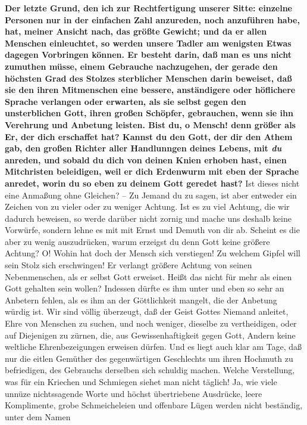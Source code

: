 \label{ref:10_08_duzen} \textbf{Der letzte Grund, den ich zur Rechtfertigung
unserer Sitte: einzelne Personen
nur in der einfachen Zahl anzureden, noch anzuführen habe, hat, meiner Ansicht
nach, das größte Gewicht; und da er allen Menschen einleuchtet, so werden unsere
Tadler am wenigsten Etwas dagegen Vorbringen können. Er besteht darin, daß man
es uns nicht zumuthen müsse, einem Gebrauche nachzugehen, der gerade den
höchsten Grad des Stolzes sterblicher Menschen darin beweiset, daß sie den ihren
Mitmenschen eine bessere, anständigere oder höflichere Sprache verlangen oder
erwarten, als sie selbst gegen den unsterblichen Gott, ihren großen Schöpfer,
gebrauchen, wenn sie ihn Verehrung und Anbetung leisten.  Bist du, o Mensch! denn
größer als Er, der dich erschaffet hat? Kannst du den Gott, der dir den Athem
gab, den großen Richter aller Handlunngen deines Lebens, mit \textit{du}
anreden, und
sobald du dich von deinen Knien erhoben hast, einen Mitchristen beleidigen, weil
er dich Erdenwurm mit eben der Sprache anredet, worin du so
eben zu deinem Gott
geredet hast?} Ist dieses nicht eine Anmaßung ohne Gleichen? -- Zu Jemand du zu
sagen, ist aber entweder ein Zeichen von zu vieler oder zu weniger Achtung. Ist
es zu viel Achtung, die wir dadurch beweisen, so werde darüber nicht zornig und
mache uns deshalb keine Vorwürfe, sondern lehne es mit mit Ernst und Demuth von
dir ab. Scheint es die aber zu wenig auszudrücken, warum erzeigst du denn Gott
keine größere Achtung? O! Wohin hat doch der Mensch sich verstiegen! Zu welchem
Gipfel will sein Stolz sich erschwingen! Er verlangt größere Achtung von seinen
Nebenmenschen, als er selbst Gott erweiset. Heißt das nicht für mehr als einen
Gott gehalten sein wollen? Indessen dürfte es ihm unter und eben so sehr an
Anbetern fehlen, als es ihm an der Göttlichkeit mangelt, die der Anbetung würdig
ist. Wir sind völlig überzeugt, daß der Geist Gottes Niemand anleitet, Ehre von
Menschen zu suchen, und noch weniger, dieselbe zu vertheidigen, oder auf
Diejenigen zu zürnen, die, aus Gewissenhaftigkeit gegen Gott, Andern keine
weltliche Ehrenbezeigungen erweisen dürfen. Und es liegt auch klar am Tage, daß
nur die eitlen Gemüther des gegenwärtigen Geschlechts um ihren Hochmuth zu
befriedigen, des Gebrauchs derselben sich schuldig machen. Welche Verstellung,
was für ein Kriechen und Schmiegen siehet man nicht täglich! Ja,
wie viele
unnüze nichtssagende Worte und höchst übertriebene Ausdrücke, leere Komplimente,
grobe Schmeicheleien und offenbare Lügen werden nicht beständig, unter dem Namen
